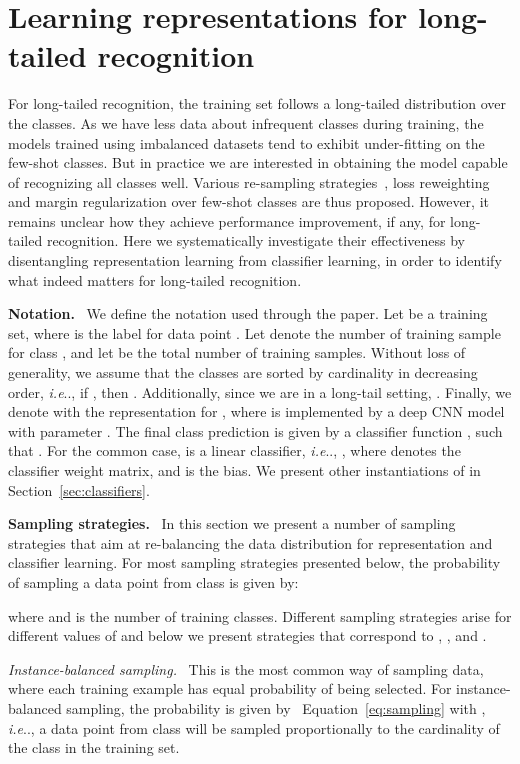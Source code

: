 \documentclass[dvipsnames]{article} \usepackage{iclr2020_conference, times}
\makeatletter
\DeclareRobustCommand\onedot{\futurelet\@let@token\@onedot}
\def\@onedot{\ifx\@let@token.\else.\null\fi\xspace}
\def\ie{\emph{i.e}\onedot} \def\Ie{\emph{I.e}\onedot}
\def\Eqref#1{Equation~\ref{#1}}
\newcommand{\header}[1]{\noindent\textbf{#1.}~}
\newcommand{\headerit}[1]{\noindent\textit{#1.}~}
\newcommand{\uniform}{instance-balanced\xspace}
\newcommand{\Uniform}{Instance-balanced\xspace}
\makeatother
\begin{document}
 

\section{Learning representations for long-tailed recognition}
\label{sec:representation}


For long-tailed recognition, the training set  follows a long-tailed distribution over the classes. As we have less data about infrequent classes during training, the models trained using imbalanced datasets tend to exhibit under-fitting on the few-shot classes. {But in practice  we are interested in obtaining the model capable of  recognizing all classes well. } Various re-sampling strategies~\citep{chawla2002smote, shen2016relay, cao2019learning}, loss reweighting and margin  regularization over few-shot classes are  thus  proposed.  However, it remains unclear how they achieve     performance  improvement, if any, for long-tailed recognition.  Here we  systematically investigate their effectiveness  by disentangling representation learning from classifier learning, in order  to   identify what indeed matters for long-tailed recognition.


\header{Notation} We define the notation used through the paper. Let  be a training set, where  is the label for data point . Let  denote the number of training sample for class , and let  be the total number of training samples. Without loss of generality, we assume that the classes are sorted by cardinality in decreasing order, \ie, if , then . Additionally, since we are in a long-tail setting, . Finally, we denote with  the representation for , where  is implemented by a deep CNN model with parameter  . The final class prediction  is given by a classifier function , such that . For the common case,  is a linear classifier, \ie, , where  denotes the classifier weight matrix, and  is the bias. We present other instantiations of  in Section~\ref{sec:classifiers}.

\header{Sampling strategies}
In this section we present a number of sampling strategies that aim at re-balancing the data distribution for representation and classifier learning. 
For most sampling strategies presented below, the probability  of sampling a data point from class  is given by:


where  and  is the number of training classes. Different sampling strategies arise for different values of  and below we present strategies that correspond to , , and . 

\headerit{\Uniform sampling}
This is the most common way of sampling data, where each training example has equal probability of being selected. For \uniform sampling, the probability  is given by ~\Eqref{eq:sampling} with , \ie, a data point from class  will be sampled proportionally to the cardinality  of the class in the training set. 
\end{document}

